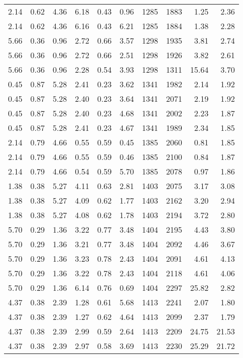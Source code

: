 \begin{longtable}{rrrrrrrrrr}
2.14	&	0.62	&	4.36	&	6.18	&	0.43	&	0.96	&	1285	&	1883	&	1.25	&	2.36	\\
2.14	&	0.62	&	4.36	&	6.16	&	0.43	&	6.21	&	1285	&	1884	&	1.38	&	2.28	\\
5.66	&	0.36	&	0.96	&	2.72	&	0.66	&	3.57	&	1298	&	1935	&	3.81	&	2.74	\\
5.66	&	0.36	&	0.96	&	2.72	&	0.66	&	2.51	&	1298	&	1926	&	3.82	&	2.61	\\
5.66	&	0.36	&	0.96	&	2.28	&	0.54	&	3.93	&	1298	&	1311	&	15.64	&	3.70	\\
0.45	&	0.87	&	5.28	&	2.41	&	0.23	&	3.62	&	1341	&	1982	&	2.14	&	1.92	\\
0.45	&	0.87	&	5.28	&	2.40	&	0.23	&	3.64	&	1341	&	2071	&	2.19	&	1.92	\\
0.45	&	0.87	&	5.28	&	2.40	&	0.23	&	4.68	&	1341	&	2002	&	2.23	&	1.87	\\
0.45	&	0.87	&	5.28	&	2.41	&	0.23	&	4.67	&	1341	&	1989	&	2.34	&	1.85	\\
2.14	&	0.79	&	4.66	&	0.55	&	0.59	&	0.45	&	1385	&	2060	&	0.81	&	1.85	\\
2.14	&	0.79	&	4.66	&	0.55	&	0.59	&	0.46	&	1385	&	2100	&	0.84	&	1.87	\\
2.14	&	0.79	&	4.66	&	0.54	&	0.59	&	5.70	&	1385	&	2078	&	0.97	&	1.86	\\
1.38	&	0.38	&	5.27	&	4.11	&	0.63	&	2.81	&	1403	&	2075	&	3.17	&	3.08	\\
1.38	&	0.38	&	5.27	&	4.09	&	0.62	&	1.77	&	1403	&	2162	&	3.20	&	2.94	\\
1.38	&	0.38	&	5.27	&	4.08	&	0.62	&	1.78	&	1403	&	2194	&	3.72	&	2.80	\\
5.70	&	0.29	&	1.36	&	3.22	&	0.77	&	3.48	&	1404	&	2195	&	4.43	&	3.80	\\
5.70	&	0.29	&	1.36	&	3.21	&	0.77	&	3.48	&	1404	&	2092	&	4.46	&	3.67	\\
5.70	&	0.29	&	1.36	&	3.23	&	0.78	&	2.43	&	1404	&	2091	&	4.61	&	4.13	\\
5.70	&	0.29	&	1.36	&	3.22	&	0.78	&	2.43	&	1404	&	2118	&	4.61	&	4.06	\\
5.70	&	0.29	&	1.36	&	6.14	&	0.76	&	0.69	&	1404	&	2297	&	25.82	&	2.82	\\
4.37	&	0.38	&	2.39	&	1.28	&	0.61	&	5.68	&	1413	&	2241	&	2.07	&	1.80	\\
4.37	&	0.38	&	2.39	&	1.27	&	0.62	&	4.64	&	1413	&	2099	&	2.37	&	1.79	\\
4.37	&	0.38	&	2.39	&	2.99	&	0.59	&	2.64	&	1413	&	2209	&	24.75	&	21.53	\\
4.37	&	0.38	&	2.39	&	2.97	&	0.58	&	3.69	&	1413	&	2230	&	25.29	&	21.72	\\

\end{longtable}
